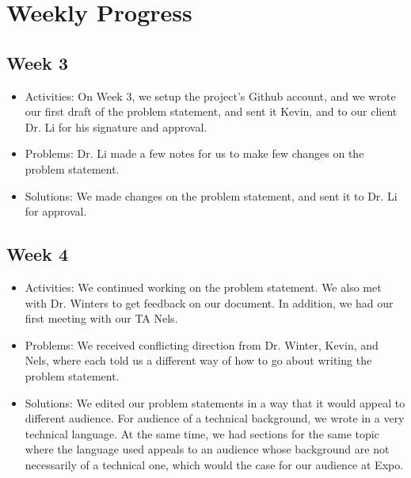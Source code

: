 \documentclass[10pt,draftclsnofoot,onecolumn,journal,compsoc]{IEEEtran}
\begin{document}

\section{Weekly Progress}
\subsection{Week 3}
\begin{itemize}
\item Activities: 
On Week 3, we setup the project's Github account, and we wrote our first draft of the problem statement, and sent it Kevin, and to our client Dr. Li for his signature and approval. 
\item Problems: 
Dr. Li made a few notes for us to make few changes on the problem statement.
\item Solutions: 
We made changes on the problem statement, and sent it to Dr. Li for approval.
\end{itemize}

\subsection{Week 4}
\begin{itemize}
\item Activities:
We continued working on the problem statement. We also met with Dr. Winters to get feedback on our document. In addition, we had our first meeting with our TA Nels.
\item Problems: 
We received conflicting direction from Dr. Winter, Kevin, and Nels, where each told us a different way of how to go about writing the problem statement.
\item Solutions: 
We edited our problem statements in a way that it would appeal to different audience. For audience of a technical background, we wrote in a very technical language. At the same time, we had sections for the same topic where the language used appeals to an audience whose background are not necessarily of a technical one, which would the case for our audience at Expo. 
\end{itemize}
\end{document}
